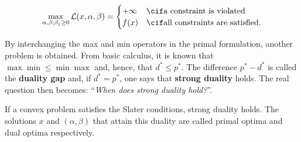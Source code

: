     \begin{gather}
        \max_{\alpha,\beta;\beta_j\geq0}\mathcal{L}(x,\alpha,\beta) =
        \begin{cases}
            +\infty&\cif\text{a constraint is violated}\\
            f(x)&\cif\text{all constraints are satisfied}.
        \end{cases}
    \end{gather}

    By interchanging the max and min operators in the primal formulation, another problem is obtained.
    From basic calculus, it is known that $\max\min\leq\min\max$ and, hence, that $d^*\leq p^*$. The difference $p^*-d^*$ is called the \textbf{duality gap} and, if $d^*=p^*$, one says that \textbf{strong duality} holds. The real question then becomes: ``\textit{When does strong duality hold?}''.
    \begin{property}
        If a convex problem satisfies the Slater conditions, strong duality holds. The solutions $x$ and $(\alpha,\beta)$ that attain this duality are called primal optima and dual optima respectively.
    \end{property}

